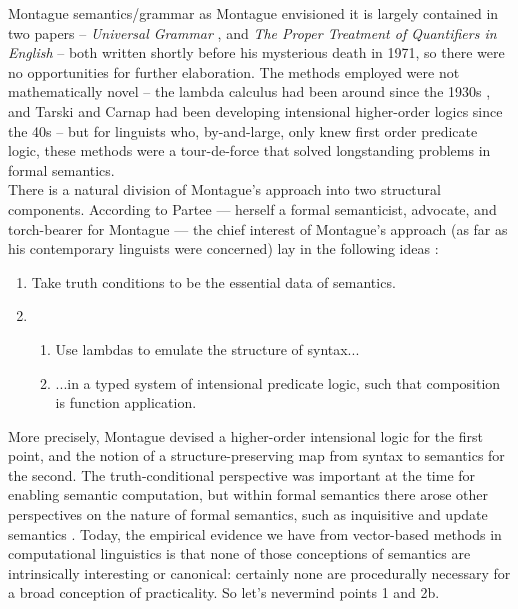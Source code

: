 Montague semantics/grammar as Montague envisioned it is largely contained in two papers -- \emph{Universal Grammar} \citep{montagueUniversalGrammar1970a}, and \emph{The Proper Treatment of Quantifiers in English} \citep{montagueProperTreatmentQuantification1973} -- both written shortly before his mysterious death in 1971, so there were no opportunities for further elaboration. The methods employed were not mathematically novel -- the lambda calculus had been around since the 1930s \citep{churchSetPostulatesFoundation1933}, and Tarski and Carnap had been developing intensional higher-order logics since the 40s \citep{carnapMeaningNecessityStudy1988} -- but for linguists who, by-and-large, only knew first order predicate logic, these methods were a tour-de-force that solved longstanding problems in formal semantics.\\

There is a natural division of Montague's approach into two structural components. According to Partee --- herself a formal semanticist, advocate, and torch-bearer for Montague --- the chief interest of Montague's approach (as far as his contemporary linguists were concerned) lay in the following ideas \citep{portnerFormalSemanticsEssential2008}:

\begin{enumerate}
\item{Take truth conditions to be the essential data of semantics.}
\item{
\begin{enumerate}
\item{Use lambdas to emulate the structure of syntax...}
\item{...in a typed system of intensional predicate logic, such that composition is function application.}
\end{enumerate}}
\end{enumerate}

More precisely, Montague devised a higher-order intensional logic for the first point, and the notion of a structure-preserving map from syntax to semantics for the second. The truth-conditional perspective was important at the time for enabling semantic computation, but within formal semantics there arose other perspectives on the nature of formal semantics, such as inquisitive \citep{InquisitiveSemanticsInquisitive} and update semantics \citep{nouwenDynamicSemantics2022}. Today, the empirical evidence we have from vector-based methods in computational linguistics is that none of those conceptions of semantics are intrinsically interesting or canonical: certainly none are procedurally necessary for a broad conception of practicality. So let's nevermind points 1 and 2b.\\

